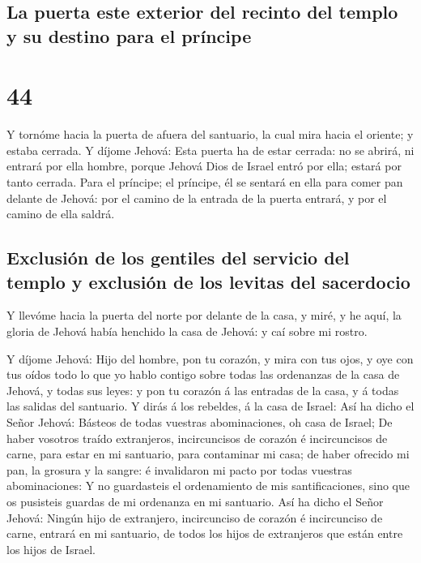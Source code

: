 \hypertarget{la-puerta-este-exterior-del-recinto-del-templo-y-su-destino-para-el-pruxedncipe}{%
\subsection{La puerta este exterior del recinto del templo y su destino
para el
príncipe}\label{la-puerta-este-exterior-del-recinto-del-templo-y-su-destino-para-el-pruxedncipe}}

\hypertarget{section-43}{%
\section{44}\label{section-43}}

 Y tornóme hacia la puerta de afuera del santuario, la
cual mira hacia el oriente; y estaba cerrada.  Y díjome
Jehová: Esta puerta ha de estar cerrada: no se abrirá, ni entrará por
ella hombre, porque Jehová Dios de Israel entró por ella; estará por
tanto cerrada.  Para el príncipe; el príncipe, él se
sentará en ella para comer pan delante de Jehová: por el camino de la
entrada de la puerta entrará, y por el camino de ella saldrá.

\hypertarget{exclusiuxf3n-de-los-gentiles-del-servicio-del-templo-y-exclusiuxf3n-de-los-levitas-del-sacerdocio}{%
\subsection{Exclusión de los gentiles del servicio del templo y
exclusión de los levitas del
sacerdocio}\label{exclusiuxf3n-de-los-gentiles-del-servicio-del-templo-y-exclusiuxf3n-de-los-levitas-del-sacerdocio}}

 Y llevóme hacia la puerta del norte por delante de la
casa, y miré, y he aquí, la gloria de Jehová había henchido la casa de
Jehová: y caí sobre mi rostro.

 Y díjome Jehová: Hijo del hombre, pon tu corazón, y mira
con tus ojos, y oye con tus oídos todo lo que yo hablo contigo sobre
todas las ordenanzas de la casa de Jehová, y todas sus leyes: y pon tu
corazón á las entradas de la casa, y á todas las salidas del santuario.
 Y dirás á los rebeldes, á la casa de Israel: Así ha dicho
el Señor Jehová: Básteos de todas vuestras abominaciones, oh casa de
Israel;  De haber vosotros traído extranjeros,
incircuncisos de corazón é incircuncisos de carne, para estar en mi
santuario, para contaminar mi casa; de haber ofrecido mi pan, la grosura
y la sangre: é invalidaron mi pacto por todas vuestras abominaciones:
 Y no guardasteis el ordenamiento de mis santificaciones,
sino que os pusisteis guardas de mi ordenanza en mi santuario.
 Así ha dicho el Señor Jehová: Ningún hijo de extranjero,
incircunciso de corazón é incircunciso de carne, entrará en mi
santuario, de todos los hijos de extranjeros que están entre los hijos
de Israel.

